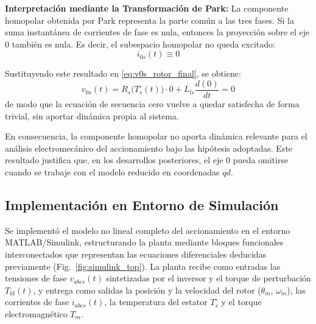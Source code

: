 \documentclass[12pt, a4paper,journal, onecolumn, compsoc]{IEEEtran}
\begin{document}
    \textbf{Interpretación mediante la Transformación de Park:}
    La componente homopolar obtenida por Park representa la parte común a las tres fases. Si la suma instantánea de corrientes de fase es nula, entonces la proyección sobre el eje \(0\) también es nula. Es decir, el subespacio homopolar no queda excitado:
    \begin{equation}
        i_{0s}(t)\equiv 0
    \end{equation}

    Sustituyendo este resultado en \eqref{eq:v0s_rotor_final}, se obtiene:
    \begin{equation}
        v_{0s}(t)=R_s\!\big(T_s^\circ(t)\big)\cdot 0 + L_{ls}\frac{d(0)}{dt}=0
    \end{equation}
    de modo que la ecuación de secuencia cero vuelve a quedar satisfecha de forma trivial, sin aportar dinámica propia al sistema.

    En consecuencia, la componente homopolar no aporta dinámica relevante para el análisis electromecánico del accionamiento bajo las hipótesis adoptadas. Este resultado justifica que, en los desarrollos posteriores, el eje \(0\) pueda omitirse cuando se trabaje con el modelo reducido en coordenadas \(qd\).


\subsection{Implementación en Entorno de Simulación}
Se implementó el modelo no lineal completo del accionamiento en el entorno MATLAB/Simulink, estructurando la planta mediante bloques funcionales interconectados que representan las ecuaciones diferenciales deducidas previamente (Fig.~\ref{fig:simulink_top}). La planta recibe como entradas las tensiones de fase $v_{abcs}(t)$ sintetizadas por el inversor y el torque de perturbación $T_{ld}(t)$, y entrega como salidas la posición y la velocidad del rotor ($\theta_m$, $\omega_m$), las corrientes de fase $i_{abcs}(t)$, la temperatura del estator $T_s^\circ$ y el torque electromagnético $T_m$.
\end{document}
